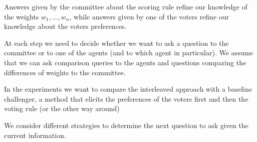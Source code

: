 Answers given by the committee about the scoring rule refine our knowledge of the weights $w_1,\ldots,w_n$, while
answers given by one of the voters refine our knowledge about the voters preferences.

At each step we need to decide whether we want to ask a question to the committee or to one of the agents (and to which agent in particular). We assume that we can ask comparison queries to the agents and questions comparing the differences of weights to the committee. 

In the experiments we want to compare the interleaved approach with a baseline challenger, a method  that elicits the preferences of the voters first and then the voting rule (or the other way around)


We consider different strategies to determine the next question to ask given the current information.


